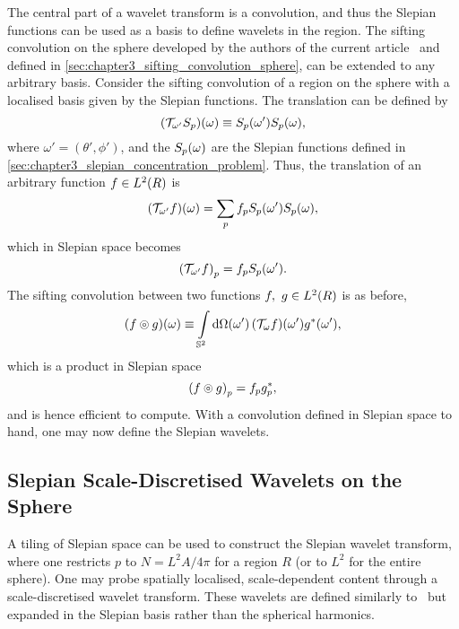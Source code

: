 The central part of a wavelet transform is a convolution, and thus the Slepian functions can be used as a basis to define wavelets in the region.
The sifting convolution on the sphere developed by the authors of the current article~\cite{Roddy2021} and defined in \cref{sec:chapter3_sifting_convolution_sphere}, can be extended to any arbitrary basis.
Consider the sifting convolution of a region on the sphere with a localised basis given by the Slepian functions.
The translation can be defined by
%
\begin{equation}
	\pixel{(\translation{\omega'}\slepian{S})}
	\equiv \pixel[']{\slepian{S}} \pixel{\slepian{S}},
\end{equation}
%
where \(\omega'=(\theta',\phi')\), and the \(\pixel{\slepian{S}}\) are the Slepian functions defined in \cref{sec:chapter3_slepian_concentration_problem}.
Thus, the translation of an arbitrary function \(f \in \hilbert{R}\) is
%
\begin{equation}
	\pixel{(\translation{\omega'}f)} = \slepianSum \slepian{f} \pixel[']{\slepian{S}} \pixel{\slepian{S}},
\end{equation}
%
which in Slepian space becomes
%
\begin{equation}
	\slepian{(\translation{\omega'}f)} = \slepian{f} \pixel[']{\slepian{S}}.
\end{equation}
%
The sifting convolution between two functions \(f,\ g \in \hilbert{R}\) is as before, \ie{}
%
\begin{equation}
	\pixel{\convolution{f}{g}}
	\equiv \integrateSphere{\omega'} \pixel[']{(\translation{\omega}f)} \pixel[']{\conj{g}},
\end{equation}
%
which is a product in Slepian space
%
\begin{equation}
	\slepian{\convolution{f}{g}}
	= \slepian{f} \conj{\slepian{g}},
\end{equation}
%
and is hence efficient to compute.
With a convolution defined in Slepian space to hand, one may now define the Slepian wavelets.

\subsection{Slepian Scale-Discretised Wavelets on the Sphere}\label{sec:chapter3_slepian_scale_discretised_wavelets_sphere}

A tiling of Slepian space can be used to construct the Slepian wavelet transform, where one restricts \(p\) to \(N=L^{2}A/4\pi{}\) for a region \(R\) (or to \(L^{2}\) for the entire sphere).
One may probe spatially localised, scale-dependent content through a scale-discretised wavelet transform.
These wavelets are defined similarly to~\cite{Wiaux2008,McEwen2018} but expanded in the Slepian basis rather than the spherical harmonics.

